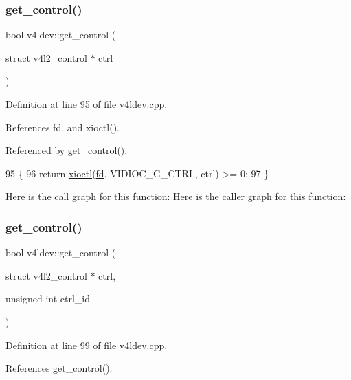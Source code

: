 \subsubsection{\texorpdfstring{get\+\_\+control()}{get\_control()}\hspace{0.1cm}{\footnotesize\ttfamily [1/2]}}
{\footnotesize\ttfamily bool v4ldev\+::get\+\_\+control (\begin{DoxyParamCaption}\item[{struct v4l2\+\_\+control $\ast$}]{ctrl }\end{DoxyParamCaption})}



Definition at line 95 of file v4ldev.\+cpp.



References fd, and xioctl().



Referenced by get\+\_\+control().


\begin{DoxyCode}
95                                                    \{
96     \textcolor{keywordflow}{return} \hyperlink{classv4ldev_ab93cb1ab18254ca362310b006bd2552d}{xioctl}(\hyperlink{classv4ldev_a2cd44be3be75a19ab8bec12b28e29142}{fd}, VIDIOC\_G\_CTRL, ctrl) >= 0;
97 \}
\end{DoxyCode}
Here is the call graph for this function\+:
Here is the caller graph for this function\+:
\mbox{\label{classv4ldev_a3244e54e71d070f383bcf3272a588e17}} 
\subsubsection{\texorpdfstring{get\+\_\+control()}{get\_control()}\hspace{0.1cm}{\footnotesize\ttfamily [2/2]}}
{\footnotesize\ttfamily bool v4ldev\+::get\+\_\+control (\begin{DoxyParamCaption}\item[{struct v4l2\+\_\+control $\ast$}]{ctrl,  }\item[{unsigned int}]{ctrl\+\_\+id }\end{DoxyParamCaption})}



Definition at line 99 of file v4ldev.\+cpp.



References get\+\_\+control().


